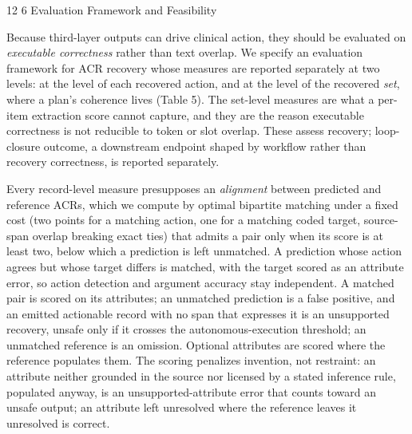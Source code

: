\documentclass[3p,twocolumn]{elsarticle}
\makeatletter
\renewcommand\section{\@startsection{section}{1}{\z@}%
           {12\p@ \@plus 4\p@ \@minus 4\p@}%
           {6\p@ \@plus 4\p@ \@minus 3\p@}%
           {\normalsize\bfseries\boldmath}}
\makeatother
\begin{document}
\section{Evaluation Framework and Feasibility}\label{evaluation-framework-and-feasibility}

Because third-layer outputs can drive clinical action, they should be evaluated on \emph{executable correctness} rather than text overlap. We specify an evaluation framework for ACR recovery whose measures are reported separately at two levels: at the level of each recovered action, and at the level of the recovered \emph{set}, where a plan's coherence lives (Table 5). The set-level measures are what a per-item extraction score cannot capture, and they are the reason executable correctness is not reducible to token or slot overlap. These assess recovery; loop-closure outcome, a downstream endpoint shaped by workflow rather than recovery correctness, is reported separately.

Every record-level measure presupposes an \emph{alignment} between predicted and reference ACRs, which we compute by optimal bipartite matching under a fixed cost (two points for a matching action, one for a matching coded target, source-span overlap breaking exact ties) that admits a pair only when its score is at least two, below which a prediction is left unmatched. A prediction whose action agrees but whose target differs is matched, with the target scored as an attribute error, so action detection and argument accuracy stay independent. A matched pair is scored on its attributes; an unmatched prediction is a false positive, and an emitted actionable record with no span that expresses it is an unsupported recovery, unsafe only if it crosses the autonomous-execution threshold; an unmatched reference is an omission. Optional attributes are scored where the reference populates them. The scoring penalizes invention, not restraint: an attribute neither grounded in the source nor licensed by a stated inference rule, populated anyway, is an unsupported-attribute error that counts toward an unsafe output; an attribute left unresolved where the reference leaves it unresolved is correct.
\end{document}
